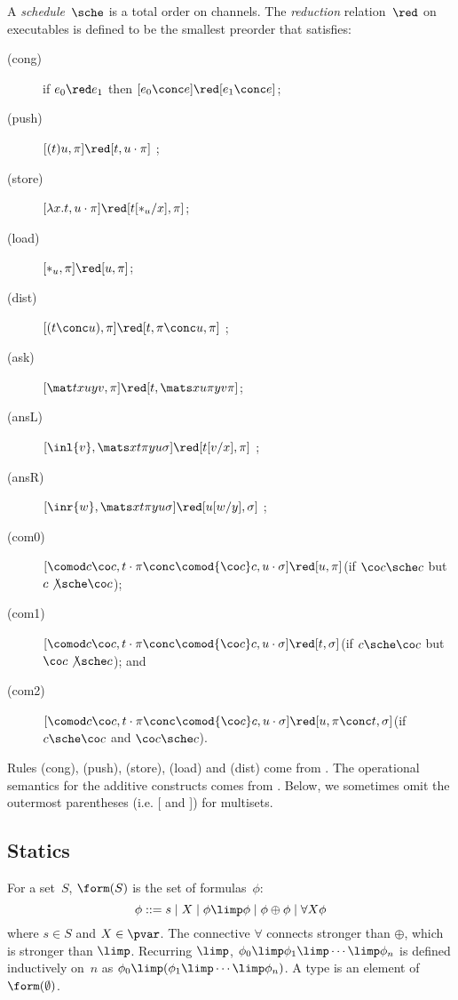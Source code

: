 A \textit{schedule}~$\sche$ is a total order on channels.
The \textit{reduction} relation~$\red$ on executables
is defined to be the smallest preorder
that satisfies:
\begin{description}
 \item[(cong)] if
      $e_0         \red e_1$
      then
      $[e_0 \conc e] \red [e_1\conc e]$\enspace;
 \item[(push)]
	    $[(t)u,\pi]      \red [t,u\cdot\pi]$      \enspace;
 \item[(store)]
	    $[\lambda x.t,u\cdot\pi]
	     \red
	     [t[\ast_u/x],      \pi]$\enspace;
 \item[(load)]
	    $[\ast_u,\pi]\red [u,\pi]$\enspace;
 \item[(dist)]
           $[(t\conc u),\pi]  \red [t,\pi\conc u,\pi]$ \enspace;
 \item[(ask)]
      $[\mat t x u y v,\pi]\red [t,\mats x u \pi y v \pi]$\enspace;
 \item[(ansL)]
           $[\inl{v}, \mats xt\pi yu\sigma] \red [t[v/x],\pi] $ \enspace;
 \item[(ansR)]
           $[\inr{w}, \mats xt\pi yu\sigma] \red [u[w/y],\sigma] $ \enspace;
 \item[(com0)]
	    $[\comod c{\co c}, t\cdot\pi\conc \comod{\co c}c,
	    u\cdot\sigma] \red
	    [u,\pi]$\enspace(if $\co c\sche c$ but $c\not\sche \co c$)\enspace;
 \item[(com1)]
	    $[\comod c{\co c}, t\cdot\pi\conc \comod{\co c}c,
	    u\cdot\sigma] \red
	    [t,\sigma]$\enspace(if $c\sche \co c$ but $\co c\not\sche c$)\enspace; and
 \item[(com2)]
	    $[\comod c{\co c}, t\cdot\pi\conc \comod{\co c}c,
	    u\cdot\sigma] \red
	    [u,\pi\conc t,\sigma]$\enspace(if $c\sche \co c$ and $\co c\sche
       c$)\enspace.
\end{description}
Rules (cong), (push), (store), (load) and (dist) come from \citet{danos-krivine}.
The operational semantics for the additive constructs comes from \citet{curien-mac}.
Below, we sometimes omit the outermost parentheses (i.e. [ and ]) for multisets.



\subsection{Statics}
For a set~$S$,
$\form(S)$ is the set of formulas~$\phi$:
\[
\phi::= s \mid X \mid \phi\limp\phi\mid \phi\oplus\phi\mid
\forall X \phi
\]
where $s\in S$ and $X\in \pvar$.
The connective $\forall$ connects stronger than $\oplus$, which is
stronger than $\limp$.
Recurring $\limp$,
$\phi_0\limp\phi_1\limp\cdots\limp\phi_n$ is defined inductively on~$n$
as
$\phi_0\limp(\phi_1\limp\cdots\limp\phi_n)$.
A type is an element of $\form(\emptyset)$.


